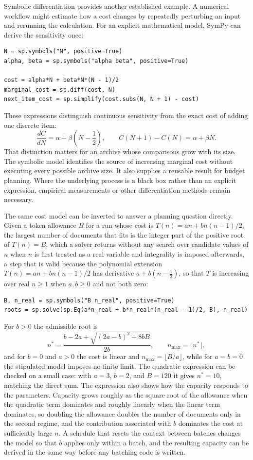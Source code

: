 \documentclass[11pt]{article}
\theoremstyle{remark}
\begin{document}
Symbolic differentiation provides another established example. A numerical workflow might estimate how a cost changes by repeatedly perturbing an input and rerunning the calculation. For an explicit mathematical model, SymPy can derive the sensitivity once:
\begin{verbatim}
N = sp.symbols("N", positive=True)
alpha, beta = sp.symbols("alpha beta", positive=True)

cost = alpha*N + beta*N*(N - 1)/2
marginal_cost = sp.diff(cost, N)
next_item_cost = sp.simplify(cost.subs(N, N + 1) - cost)
\end{verbatim}
These expressions distinguish continuous sensitivity from the exact cost of adding one discrete item:
\begin{equation}
\frac{dC}{dN} = \alpha + \beta\left(N - \frac{1}{2}\right),
\qquad
C(N+1) - C(N) = \alpha + \beta N.
\end{equation}
That distinction matters for an archive whose comparisons grow with its size. The symbolic model identifies the source of increasing marginal cost without executing every possible archive size. It also supplies a reusable result for budget planning. Where the underlying process is a black box rather than an explicit expression, empirical measurements or other differentiation methods remain necessary.

The same cost model can be inverted to answer a planning question directly. Given a token allowance $B$ for a run whose cost is $T(n) = an + bn(n-1)/2$, the largest number of documents that fits is the integer part of the positive root of $T(n) = B$, which a solver returns without any search over candidate values of $n$ when $n$ is first treated as a real variable and integrality is imposed afterwards, a step that is valid because the polynomial extension $T(n) = an + bn(n-1)/2$ has derivative $a + b(n - \tfrac{1}{2})$, so that $T$ is increasing over real $n \ge 1$ when $a, b \ge 0$ and not both zero:
\begin{verbatim}
B, n_real = sp.symbols("B n_real", positive=True)
roots = sp.solve(sp.Eq(a*n_real + b*n_real*(n_real - 1)/2, B), n_real)
\end{verbatim}
For $b > 0$ the admissible root is
\begin{equation}
n^{*} = \frac{b - 2a + \sqrt{(2a - b)^2 + 8bB}}{2b}, \qquad n_{\max} = \lfloor n^{*} \rfloor,
\end{equation}
and for $b = 0$ and $a > 0$ the cost is linear and $n_{\max} = \lfloor B/a \rfloor$, while for $a = b = 0$ the stipulated model imposes no finite limit. The quadratic expression can be checked on a small case: with $a = 3$, $b = 2$, and $B = 120$ it gives $n^{*} = 10$, matching the direct sum. The expression also shows how the capacity responds to the parameters. Capacity grows roughly as the square root of the allowance when the quadratic term dominates and roughly linearly when the linear term dominates, so doubling the allowance doubles the number of documents only in the second regime, and the contribution associated with $b$ dominates the cost at sufficiently large $n$. A schedule that resets the context between batches changes the model so that $b$ applies only within a batch, and the resulting capacity can be derived in the same way before any batching code is written.
\end{document}
